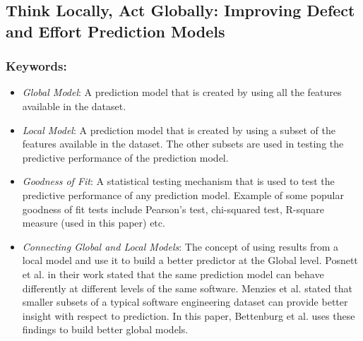 \documentclass{sig-alternate-05-2015}
\begin{document}
\subsection{Think Locally, Act Globally: Improving Defect and Effort Prediction Models \cite{Bettenburg:2012}}

\subsubsection{Keywords:}
\begin{itemize}
\item \emph{Global Model}: A prediction model that is created by using all the features available in the dataset.
\item \emph{Local Model}:  A prediction model that is created by using a subset of the features available in the dataset. The other subsets are used in testing the predictive performance of the prediction model.
\item \emph{Goodness of Fit}: A statistical testing mechanism that is used to test the predictive performance of any prediction model. Example of some popular goodness of fit tests include Pearson's test, chi-squared test, R-square measure (used in this paper) etc.
\item \emph{Connecting Global and Local Models}: The concept of using results from a local model and use it to build a better predictor at the Global level. Posnett et al. in their work \cite{Posnett:2011} stated that the same prediction model can behave differently at different levels of the same software. Menzies et al. \cite{Menzies:2011} stated that smaller subsets of a typical software engineering dataset can provide better insight with respect to prediction. In this paper, Bettenburg et al. uses these findings to build better global models.
\end{itemize} 
\end{document}
